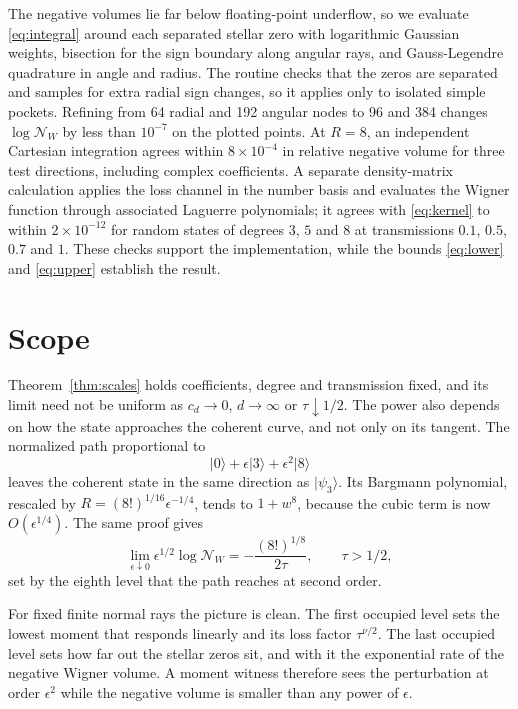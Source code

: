 \documentclass[11pt,a4paper]{article}
\newcommand{\ket}[1]{|#1\rangle}
\newcommand{\NW}{\mathcal N_W}
\begin{document}
The negative volumes lie far below floating-point underflow, so we evaluate \eqref{eq:integral} around each separated stellar zero with logarithmic Gaussian weights, bisection for the sign boundary along angular rays, and Gauss-Legendre quadrature in angle and radius. The routine checks that the zeros are separated and samples for extra radial sign changes, so it applies only to isolated simple pockets. Refining from 64 radial and 192 angular nodes to 96 and 384 changes $\log\NW$ by less than $10^{-7}$ on the plotted points. At $R=8$, an independent Cartesian integration agrees within $8\times10^{-4}$ in relative negative volume for three test directions, including complex coefficients. A separate density-matrix calculation applies the loss channel in the number basis and evaluates the Wigner function through associated Laguerre polynomials; it agrees with \eqref{eq:kernel} to within $2\times10^{-12}$ for random states of degrees $3$, $5$ and $8$ at transmissions $0.1$, $0.5$, $0.7$ and $1$. These checks support the implementation, while the bounds \eqref{eq:lower} and \eqref{eq:upper} establish the result.

\section{Scope}

Theorem~\ref{thm:scales} holds coefficients, degree and transmission fixed, and its limit need not be uniform as $c_d\to0$, $d\to\infty$ or $\tau\downarrow1/2$. The power also depends on how the state approaches the coherent curve, and not only on its tangent. The normalized path proportional to
\begin{equation}
 \ket0+\epsilon\ket3+\epsilon^2\ket8
 \label{eq:curved}
\end{equation}
leaves the coherent state in the same direction as $\ket{\psi_3}$. Its Bargmann polynomial, rescaled by $R=(8!)^{1/16}\epsilon^{-1/4}$, tends to $1+w^8$, because the cubic term is now $O(\epsilon^{1/4})$. The same proof gives
\begin{equation}
 \lim_{\epsilon\downarrow0}\epsilon^{1/2}\log\NW
 =-\frac{(8!)^{1/8}}{2\tau},\qquad \tau>1/2,
\end{equation}
set by the eighth level that the path reaches at second order.

For fixed finite normal rays the picture is clean. The first occupied level sets the lowest moment that responds linearly and its loss factor $\tau^{\nu/2}$. The last occupied level sets how far out the stellar zeros sit, and with it the exponential rate of the negative Wigner volume. A moment witness therefore sees the perturbation at order $\epsilon^2$ while the negative volume is smaller than any power of $\epsilon$.
\end{document}

